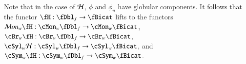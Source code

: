 Note that in the case of $\mathcal{H}$, $\phi$ and $\phi_u$ have globular components. It follows that the functor $\fH: \fDbl_f \rightarrow \fBicat$ lifts to the functors $\cM on_w \fH: \cMon_w\fDbl_f \rightarrow \cMon_w \fBicat$, $\cBr_w \fH: \cBr_w\fDbl_f \rightarrow \cBr_w \fBicat$,  $\cSyl_w\cH: \cSyl_w\fDbl_f \rightarrow \cSyl_w\fBicat$, and $\cSym_w \fH: \cSym_w\fDbl_f \rightarrow \cSym_w \fBicat$.